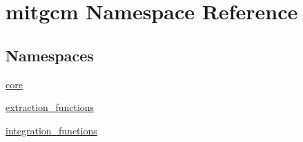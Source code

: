 \hypertarget{namespacemitgcm}{\section{mitgcm Namespace Reference}
\label{namespacemitgcm}
}
\subsection*{Namespaces}
\begin{DoxyCompactItemize}
\item 
 \hyperlink{namespacemitgcm_1_1core}{core}
\item 
 \hyperlink{namespacemitgcm_1_1extraction__functions}{extraction\+\_\+functions}
\item 
 \hyperlink{namespacemitgcm_1_1integration__functions}{integration\+\_\+functions}
\end{DoxyCompactItemize}
